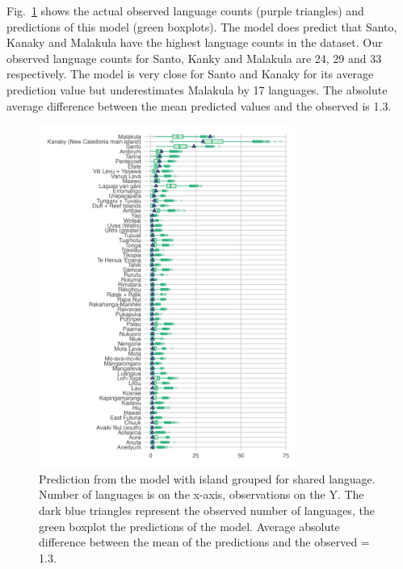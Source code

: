\documentclass[unnumsec,webpdf,modern,medium]{oup-authoring-template}
\begin{document}
Fig.~\ref{medium_model_predict} shows the actual observed language counts (purple triangles) and predictions of this model (green boxplots). The model does predict that Santo, Kanaky and Malakula have the highest language counts in the dataset. Our observed language counts for Santo, Kanky and Malakula are 24, 29 and 33 respectively. The model is very close for Santo and Kanaky for its average prediction value but underestimates Malakula by 17 languages. The absolute average difference between the mean predicted values and the observed is 1.3.


\begin{figure}[ht]
\centering
\includegraphics[width=0.75\textwidth]{brms_predict_medium.png}
\caption{Prediction from the model with island grouped for shared language. Number of languages is on the x-axis, observations on the Y. The dark blue triangles represent the observed number of languages, the green boxplot the predictions of the model. Average absolute difference between the mean of the predictions and the observed = 1.3.}
\label{medium_model_predict}
\end{figure}
\end{document}
